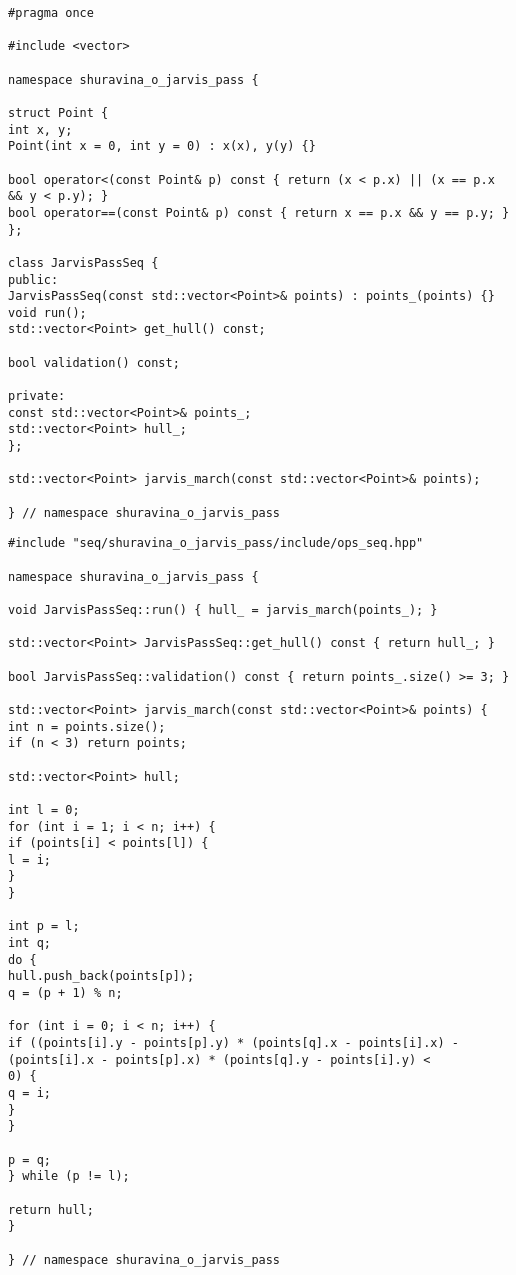 \documentclass[12pt]{article}
\begin{document}
\newpage

\begin{lstlisting}[caption={ops\_seq\_.hpp}]
#pragma once

#include <vector>

namespace shuravina_o_jarvis_pass {

struct Point {
int x, y;
Point(int x = 0, int y = 0) : x(x), y(y) {}

bool operator<(const Point& p) const { return (x < p.x) || (x == p.x && y < p.y); }
bool operator==(const Point& p) const { return x == p.x && y == p.y; }
};

class JarvisPassSeq {
public:
JarvisPassSeq(const std::vector<Point>& points) : points_(points) {}
void run();
std::vector<Point> get_hull() const;

bool validation() const;

private:
const std::vector<Point>& points_;
std::vector<Point> hull_;
};

std::vector<Point> jarvis_march(const std::vector<Point>& points);

} // namespace shuravina_o_jarvis_pass
\end{lstlisting}

\newpage

\begin{lstlisting}[caption={ops\_seq\_.cpp}]
#include "seq/shuravina_o_jarvis_pass/include/ops_seq.hpp"

namespace shuravina_o_jarvis_pass {

void JarvisPassSeq::run() { hull_ = jarvis_march(points_); }

std::vector<Point> JarvisPassSeq::get_hull() const { return hull_; }

bool JarvisPassSeq::validation() const { return points_.size() >= 3; }

std::vector<Point> jarvis_march(const std::vector<Point>& points) {
int n = points.size();
if (n < 3) return points;

std::vector<Point> hull;

int l = 0;
for (int i = 1; i < n; i++) {
if (points[i] < points[l]) {
l = i;
}
}

int p = l;
int q;
do {
hull.push_back(points[p]);
q = (p + 1) % n;

for (int i = 0; i < n; i++) {
if ((points[i].y - points[p].y) * (points[q].x - points[i].x) -
(points[i].x - points[p].x) * (points[q].y - points[i].y) <
0) {
q = i;
}
}

p = q;
} while (p != l);

return hull;
}

} // namespace shuravina_o_jarvis_pass
\end{lstlisting}
\end{document}
